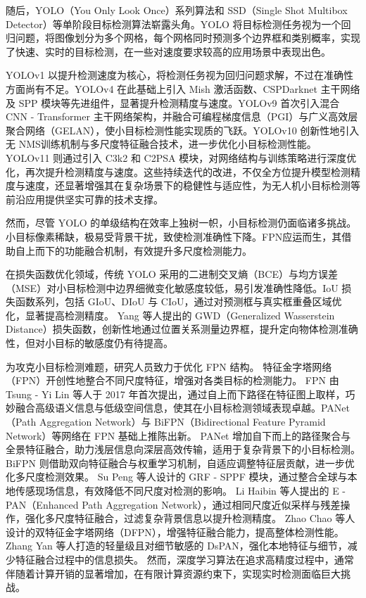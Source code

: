 随后，YOLO（You Only Look Once）\cite{yolov1, yolov2, yolov3, yolov4, yolov6, yolov7, yolov9, yolov10, yolov11}系列算法和 SSD（Single Shot Multibox Detector）\cite{ssd, dssd}等单阶段目标检测算法崭露头角。YOLO 将目标检测任务视为一个回归问题，将图像划分为多个网格，每个网格同时预测多个边界框和类别概率，实现了快速、实时的目标检测，在一些对速度要求较高的应用场景中表现出色。

YOLOv1 以提升检测速度为核心，将检测任务视为回归问题求解，不过在准确性方面尚有不足。YOLOv4 在此基础上引入 Mish 激活函数、CSPDarknet 主干网络\cite{csp}及 SPP 模块等先进组件，显著提升检测精度与速度。YOLOv9 首次引入混合 CNN - Transformer 主干网络架构，并融合可编程梯度信息（PGI）与广义高效层聚合网络（GELAN），使小目标检测性能实现质的飞跃。YOLOv10 创新性地引入无 NMS训练机制与多尺度特征融合技术，进一步优化小目标检测性能。YOLOv11 则通过引入 C3k2 和 C2PSA 模块，对网络结构与训练策略进行深度优化，再次提升检测精度与速度。这些持续迭代的改进，不仅全方位提升模型检测精度与速度，还显著增强其在复杂场景下的稳健性与适应性，为无人机小目标检测等前沿应用提供坚实可靠的技术支撑。

然而，尽管 YOLO 的单级结构在效率上独树一帜，小目标检测仍面临诸多挑战。小目标像素稀缺，极易受背景干扰，致使检测准确性下降。FPN\cite{fpn}应运而生，其借助自上而下的功能融合机制，有效提升多尺度检测能力。

在损失函数优化领域，传统 YOLO 采用的二进制交叉熵（BCE）与均方误差（MSE）\cite{mse}对小目标检测中边界细微变化敏感度较低，易引发准确性降低。IoU 损失函数系列，包括 GIoU\cite{giou}、DIoU 与 CIoU\cite{diou}，通过对预测框与真实框重叠区域优化，显著提高检测精度。
Yang 等人\cite{gwd}提出的 GWD（Generalized Wasserstein Distance）损失函数，创新性地通过位置关系测量边界框，提升定向物体检测准确性，但对小目标的敏感度仍有待提高。

为攻克小目标检测难题，研究人员致力于优化 FPN 结构。
特征金字塔网络（FPN）开创性地整合不同尺度特征，增强对各类目标的检测能力。
FPN 由 Tsung - Yi Lin 等人于 2017 年首次提出，通过自上而下路径在特征图上取样，巧妙融合高级语义信息与低级空间信息，使其在小目标检测领域表现卓越。PANet（Path Aggregation Network）\cite{pan}与 BiFPN（Bidirectional Feature Pyramid Network）\cite{bifpn}等网络在 FPN 基础上推陈出新。
PANet 增加自下而上的路径聚合与全景特征融合，助力浅层信息向深层高效传输，适用于复杂背景下的小目标检测。
BiFPN 则借助双向特征融合与权重学习机制，自适应调整特征层贡献，进一步优化多尺度检测效果。
Su Peng 等人\cite{mod-yolo}设计的 GRF - SPPF 模块，通过整合全球与本地传感现场信息，有效降低不同尺度对检测的影响。
Li Haibin 等人\cite{yolo-pl}提出的 E - PAN（Enhanced Path Aggregation Network），通过相同尺度近似采样与残差操作，强化多尺度特征融合，过滤复杂背景信息以提升检测精度。
Zhao Chao 等人\cite{rdd-yolo}设计的双特征金字塔网络（DFPN），增强特征融合能力，提高整体检测性能。
Zhang Yan 等人\cite{dsp-yolo}打造的轻量级且对细节敏感的 DsPAN，强化本地特征与细节，减少特征融合过程中的信息损失。
然而，深度学习算法在追求高精度过程中，通常伴随着计算开销的显著增加，在有限计算资源约束下，实现实时检测面临巨大挑战。


